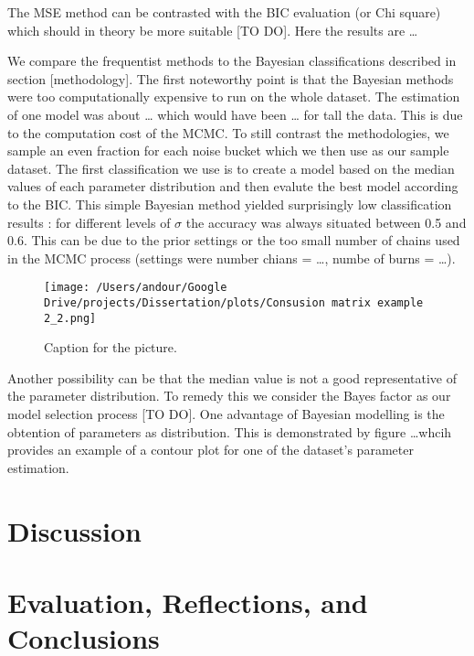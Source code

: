\documentclass[]{article}
\begin{document}
The MSE method can be contrasted with the BIC evaluation (or Chi square)
which should in theory be more suitable {[}TO DO{]}. Here the results
are \ldots{}

We compare the frequentist methods to the Bayesian classifications
described in section {[}methodology{]}. The first noteworthy point is
that the Bayesian methods were too computationally expensive to run on
the whole dataset. The estimation of one model was about \ldots{} which
would have been \ldots{} for tall the data. This is due to the
computation cost of the MCMC. To still contrast the methodologies, we
sample an even fraction for each noise bucket which we then use as our
sample dataset. The first classification we use is to create a model
based on the median values of each parameter distribution and then
evalute the best model according to the BIC. This simple Bayesian method
yielded surprisingly low classification results : for different levels
of \(\sigma\) the accuracy was always situated between 0.5 and 0.6. This
can be due to the prior settings or the too small number of chains used
in the MCMC process (settings were number chians = \ldots{}, numbe of
burns = \ldots{}).

\begin{figure}
\centering
\texttt{[image: /Users/andour/Google Drive/projects/Dissertation/plots/Consusion matrix example 2\_2.png]}
\caption{Caption for the picture.}
\end{figure}

Another possibility can be that the median value is not a good
representative of the parameter distribution. To remedy this we consider
the Bayes factor as our model selection process {[}TO DO{]}. One
advantage of Bayesian modelling is the obtention of parameters as
distribution. This is demonstrated by figure \ldots{}whcih provides an
example of a contour plot for one of the dataset's parameter estimation.

\hypertarget{discussion}{%
\section{Discussion}\label{discussion}}

\hypertarget{evaluation-reflections-and-conclusions}{%
\section{Evaluation, Reflections, and
Conclusions}\label{evaluation-reflections-and-conclusions}}
\end{document}
